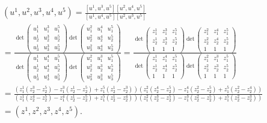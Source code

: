 \documentclass{amsart}
\theoremstyle{theorem}
\theoremstyle{lemma}
\theoremstyle{definition}
\begin{document}
\begin{align*}
&(u^1, u^2, u^3, u^4, u^5)=\frac{[u^1, u^3, u^5][u^2, u^4, u^5]}{[u^1, u^4, u^5][u^2, u^3, u^5]}\\
&=\frac{ \det\begin{pmatrix}
    u^1_1 & u^3_1 & u^5_1 \\
    u^1_2 & u^3_2 & u^5_2 \\
    u^1_3 & u^3_3 & u^5_3
\end{pmatrix}\det\begin{pmatrix}
    u^2_1 & u^4_1 & u^5_1 \\
    u^2_2 & u^4_2 & u^5_2 \\
    u^2_3 & u^4_3 & u^5_3
\end{pmatrix}}
{\det\begin{pmatrix}
    u^1_1 & u^4_1 & u^5_1 \\
    u^1_2 & u^4_2 & u^5_2 \\
    u^1_3 & u^4_3 & u^5_3
\end{pmatrix}\det\begin{pmatrix}
    u^2_1 & u^3_1 & u^5_1 \\
    u^2_2 & u^3_2 & u^5_2 \\
    u^2_3 & u^3_3 & u^5_3
\end{pmatrix}}
=\frac{ \det\begin{pmatrix}
    z^1_1 & z^3_1 & z^5_1 \\
    z^1_2 & z^3_2 & z^5_2 \\
    1 & 1 & 1
\end{pmatrix}\det\begin{pmatrix}
    z^2_1 & z^4_1 & z^5_1 \\
    z^2_2 & z^4_2 & z^5_2 \\
    1 & 1 & 1
\end{pmatrix}}
{\det\begin{pmatrix}
    z^1_1 & z^4_1 & z^5_1 \\
    z^1_2 & z^4_2 & z^5_2 \\
    1 & 1 & 1
\end{pmatrix}\det\begin{pmatrix}
    z^2_1 & z^3_1 & z^5_1 \\
    z^2_2 & z^3_2 & z^5_2 \\
    1 & 1 & 1
\end{pmatrix}}\\
&=\frac{\left(z^1_1(z^3_2-z^5_2)-z^3_1(z^1_2-z^5_2)+z^5_1(z^1_2-z^3_2)\right)\left(z^2_1(z^4_2-z^5_2)-z^4_1(z^2_2-z^5_2)+z^5_1(z^2_2-z^4_2)\right)}{\left(z^1_1(z^4_2-z^5_2)-z^4_1(z^1_2-z^5_2)+z^5_1(z^1_2-z^4_2)\right)\left(z^2_1(z^3_2-z^5_2)-z^3_1(z^2_2-z^5_2)+z^5_1(z^2_2-z^3_2)\right)}\\&=(z^1, z^2 , z^3, z^4,z^5).
\end{align*}
\end{document}
